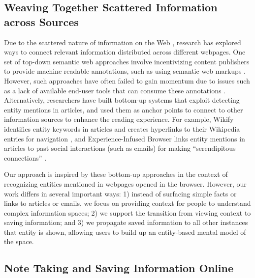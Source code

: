 \subsection{Weaving Together Scattered Information across Sources}

Due to the scattered nature of information on the Web \cite{bhavnani2005difficult}, research has explored ways to connect relevant information distributed across different webpages. One set of top-down semantic web approaches involve incentivizing content publishers to provide machine readable annotations, such as using semantic web markups \cite{karger2004haystack, berners2001publishing,berners2001weaving}. However, such approaches have often failed to gain momentum due to issues such as a lack of available end-user tools that can consume these annotations \cite{whatwentwrong}. Alternatively, researchers have built bottom-up systems that exploit detecting entity mentions in articles, and used them as anchor points to connect to other information sources to enhance the reading experience. For example, Wikify identifies entity keywords in articles and creates hyperlinks to their Wikipedia entries for navigation \cite{mihalcea2007wikify}, and Experience-Infused
Browser links entity mentions in articles to past social interactions (such as emails) for making ``serendipitous connections'' \cite{hangal2012effective}.

Our approach is inspired by these bottom-up approaches in the context of recognizing entities mentioned in webpages opened in the browser. However, our work differs in several important ways: 1) instead of surfacing simple facts or links to articles or emails, we focus on providing context for people to understand complex information spaces; 2) we support the transition from viewing context to saving information; and 3) we propagate saved information to all other instances that entity is shown, allowing users to build up an entity-based mental model of the space.



\subsection{Note Taking and Saving Information Online}

